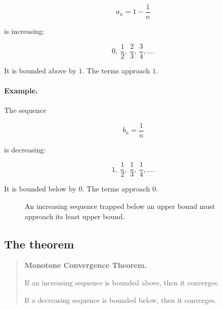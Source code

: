 \[
a_n=1-\frac1n
\]

is increasing:

\[
0,\ \frac12,\ \frac23,\ \frac34,\ldots.
\]

It is bounded above by \(1\).  The terms approach \(1\).

\paragraph{Example.}
The sequence

\[
b_n=\frac1n
\]

is decreasing:

\[
1,\ \frac12,\ \frac13,\ \frac14,\ldots.
\]

It is bounded below by \(0\).  The terms approach \(0\).

\begin{figure}[h]
\centering
{}
\caption{An increasing sequence trapped below an upper bound must approach its least upper bound.}
\label{fig:monotone-sequence-approaches-sup}
\end{figure}

\subsection{The theorem}
\label{appsubsec:monotone-convergence-theorem-statement}

\begin{quote}
\textbf{Monotone Convergence Theorem.}

If an increasing sequence is bounded above, then it converges.

If a decreasing sequence is bounded below, then it converges.
\end{quote}

